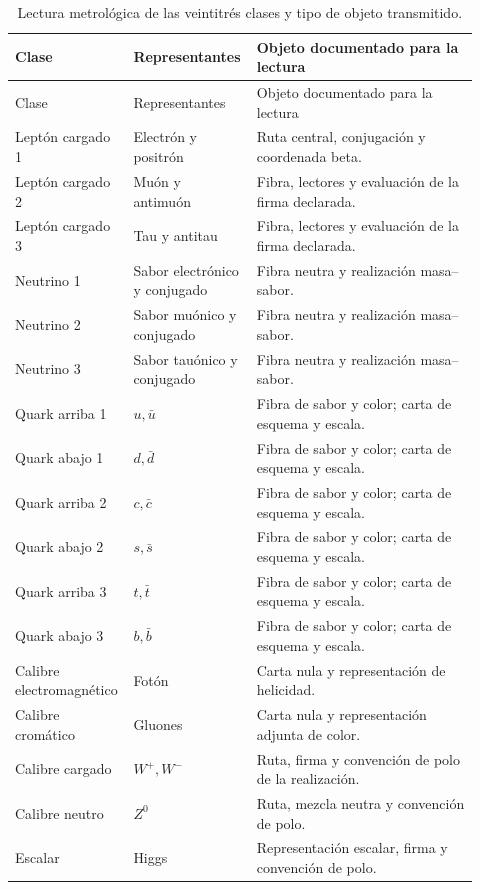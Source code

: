 \begingroup
\small
\setlength{\tabcolsep}{3pt}
\begin{longtable}{p{0.20\linewidth}p{0.25\linewidth}p{0.47\linewidth}}
\caption{Lectura metrológica de las veintitrés clases y tipo de objeto transmitido.}
\label{vi:tab:vi-clases-metrologia}\\
\toprule
Clase & Representantes & Objeto documentado para la lectura\\
\midrule
\endfirsthead
\toprule
Clase & Representantes & Objeto documentado para la lectura\\
\midrule
\endhead
\bottomrule
\endfoot
Leptón cargado 1 & Electrón y positrón & Ruta central, conjugación y coordenada beta.\\
Leptón cargado 2 & Muón y antimuón & Fibra, lectores y evaluación de la firma declarada.\\
Leptón cargado 3 & Tau y antitau & Fibra, lectores y evaluación de la firma declarada.\\
Neutrino 1 & Sabor electrónico y conjugado & Fibra neutra y realización masa--sabor.\\
Neutrino 2 & Sabor muónico y conjugado & Fibra neutra y realización masa--sabor.\\
Neutrino 3 & Sabor tauónico y conjugado & Fibra neutra y realización masa--sabor.\\
Quark arriba 1 & \(u,\bar u\) & Fibra de sabor y color; carta de esquema y escala.\\
Quark abajo 1 & \(d,\bar d\) & Fibra de sabor y color; carta de esquema y escala.\\
Quark arriba 2 & \(c,\bar c\) & Fibra de sabor y color; carta de esquema y escala.\\
Quark abajo 2 & \(s,\bar s\) & Fibra de sabor y color; carta de esquema y escala.\\
Quark arriba 3 & \(t,\bar t\) & Fibra de sabor y color; carta de esquema y escala.\\
Quark abajo 3 & \(b,\bar b\) & Fibra de sabor y color; carta de esquema y escala.\\
Calibre electromagnético & Fotón & Carta nula y representación de helicidad.\\
Calibre cromático & Gluones & Carta nula y representación adjunta de color.\\
Calibre cargado & \(W^+,W^-\) & Ruta, firma y convención de polo de la realización.\\
Calibre neutro & \(Z^0\) & Ruta, mezcla neutra y convención de polo.\\
Escalar & Higgs & Representación escalar, firma y convención de polo.\\

\end{longtable}
